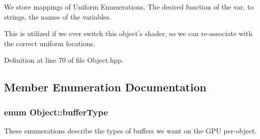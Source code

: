 We store mappings of Uniform Enumerations, The desired function of the var, to strings, the names of the variables. 

This is utilized if we ever switch this object's shader, so we can re-\/associate with the correct uniform locations. 

Definition at line 70 of file Object.\-hpp.



\subsection{Member Enumeration Documentation}
\hypertarget{class_object_a74a39247838865244defd0ae9712df9b}{
\subsubsection[{buffer\-Type}]{\setlength{\rightskip}{0pt plus 5cm}enum {\bf Object\-::buffer\-Type}\hspace{0.3cm}{\ttfamily [private]}}}\label{class_object_a74a39247838865244defd0ae9712df9b}


These enumerations describe the types of buffers we want on the G\-P\-U per-\/object. 

